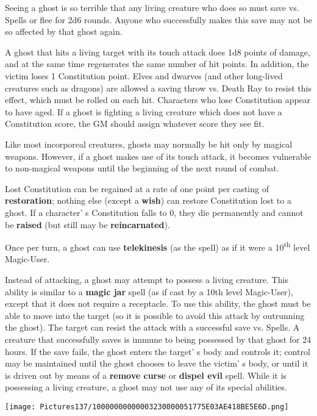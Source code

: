 \documentclass[a4paper,twoside,openany,10pt]{book}
\begin{document}
\begin{multicols}{2}
Seeing a ghost is so terrible that any living creature who does so must save vs. Spells or flee for 2d6 rounds. Anyone who successfully makes this save may not be so affected by that ghost again.

A ghost that hits a living target with its touch attack does 1d8 points of damage, and at the same time regenerates the same number of hit points. In addition, the victim loses 1 Constitution point. Elves and dwarves (and other long-lived creatures such as dragons) are allowed a saving throw vs. Death Ray to resist this effect, which must be rolled on each hit. Characters who lose Constitution appear to have aged. If a ghost is fighting a living creature which does not have a Constitution score, the GM should assign whatever score they see fit. 

Like most incorporeal creatures, ghosts may normally be hit only by magical weapons. However, if a ghost makes use of its touch attack, it becomes vulnerable to non-magical weapons until the beginning of the next round of combat.

Lost Constitution can be regained at a rate of one point per casting of \textbf{restoration}; nothing else (except a \textbf{wish}) can restore Constitution lost to a ghost. If a character' s Constitution falls to 0, they die permanently and cannot be \textbf{raised} (but still may be \textbf{reincarnated}).

Once per turn, a ghost can use \textbf{telekinesis} (as the spell) as if it were a 10\textsuperscript{th} level Magic-User.

Instead of attacking, a ghost may attempt to possess a living creature. This ability is similar to a \textbf{magic jar} spell (as if cast by a 10th level Magic-User), except that it does not require a receptacle. To use this ability, the ghost must be able to move into the target (so it is possible to avoid this attack by outrunning the ghost). The target can resist the attack with a successful save vs. Spells. A creature that successfully saves is immune to being possessed by that ghost for 24 hours. If the save fails, the ghost enters the target' s body and controls it; control may be maintained until the ghost chooses to leave the victim' s body, or until it is driven out by means of a \textbf{remove curse} or \textbf{dispel evil} spell. While it is possessing a living creature, a ghost may not use any of its special abilities.

\begin{center}
	\texttt{[image: Pictures137/10000000000003230000051775E03AE418BE5E6D.png]}
\end{center}




\end{multicols}
\end{document}

